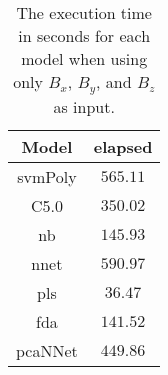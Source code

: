 \begin{table}[!ht]
	\centering
	\begin{tabular}{|c|c|}
		\hline
		Model & elapsed \\ \hline
		svmPoly & $565.11$ \\ \hline
		C5.0 & $350.02$ \\ \hline
		nb & $145.93$ \\ \hline
		nnet & $590.97$ \\ \hline
		pls & $36.47$ \\ \hline
		fda & $141.52$ \\ \hline
		pcaNNet & $449.86$ \\ \hline
	\end{tabular}
	\caption{The execution time in seconds for each model when using only $B_{x}$, $B_{y}$, and $B_{z}$ as input.}
	\label{tab:time:coord:total}
\end{table}
